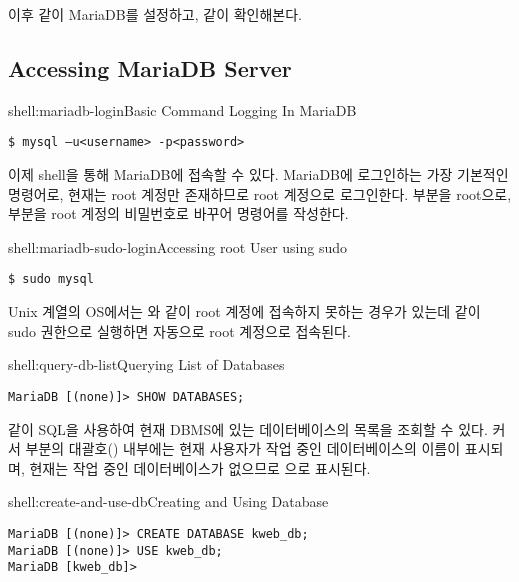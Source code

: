 이후 \와 같이 MariaDB를 설정하고, \와 같이 확인해본다.

\subsection*{Accessing MariaDB Server}

\begin{shellenv}{shell:mariadb-login}{Basic Command Logging In MariaDB}\begin{verbatim}
$ mysql –u<username> -p<password>
\end{verbatim}
\end{shellenv}

이제 shell을 통해 MariaDB에 접속할 수 있다. \은 MariaDB에 로그인하는 가장 기본적인 명령어로, 현재는 root 계정만 존재하므로 root 계정으로 로그인한다.  부분을 root으로,  부분을 root 계정의 비밀번호로 바꾸어 명령어를 작성한다.

\begin{shellenv}{shell:mariadb-sudo-login}{Accessing root User using sudo}\begin{verbatim}
$ sudo mysql
\end{verbatim}
\end{shellenv}

Unix 계열의 OS에서는 와 같이 root 계정에 접속하지 못하는 경우가 있는데 \과 같이 sudo 권한으로 실행하면 자동으로 root 계정으로 접속된다.

\begin{shellenv}{shell:query-db-list}{Querying List of Databases}\begin{verbatim}
MariaDB [(none)]> SHOW DATABASES;
\end{verbatim}
\end{shellenv}

\와 같이 SQL을 사용하여 현재 DBMS에 있는 데이터베이스의 목록을 조회할 수 있다. 커서 부분의 대괄호(\cd{[]}) 내부에는 현재 사용자가 작업 중인 데이터베이스의 이름이 표시되며, 현재는 작업 중인 데이터베이스가 없으므로 으로 표시된다.

\begin{shellenv}{shell:create-and-use-db}{Creating and Using Database}\begin{verbatim}
MariaDB [(none)]> CREATE DATABASE kweb_db;
MariaDB [(none)]> USE kweb_db;
MariaDB [kweb_db]>
\end{verbatim}
\end{shellenv}

